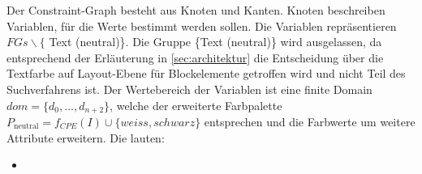 Der Constraint-Graph besteht aus Knoten und Kanten. Knoten beschreiben Variablen, für die Werte bestimmt werden sollen. Die Variablen repräsentieren $FGs \backslash\{$ Text (neutral)\}. Die Gruppe \{Text (neutral)\} wird ausgelassen, da entsprechend der Erläuterung in \autoref{sec:architektur} die Entscheidung über die Textfarbe auf Layout-Ebene für Blockelemente getroffen wird und nicht Teil des Suchverfahrens ist. Der Wertebereich der Variablen ist eine finite Domain $dom = \{d_0, ..., d_{n+2}\}$, welche der erweiterte Farbpalette $P_\text{neutral} = f_{CPE}(I) \cup \{weiss, schwarz\}$ entsprechen und die Farbwerte um weitere Attribute erweitern. Die lauten:

\begin{itemize}
	\item 
\end{itemize}